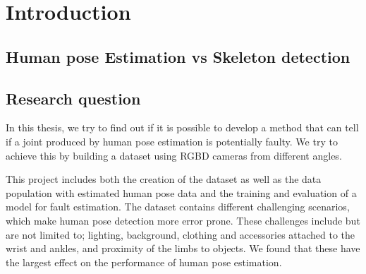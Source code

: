 \section{Introduction}

\subsection{Human pose Estimation vs Skeleton detection}



\subsection{Research question}

In this thesis, we try to find out if it is possible to develop a method that can tell if a joint produced by human pose estimation is potentially faulty. We try to achieve this by building a dataset using RGBD cameras from different angles.

This project includes both the creation of the dataset as well as the data population with estimated human pose data and the training and evaluation of a model for fault estimation. The dataset contains different challenging scenarios, which make human pose detection more error prone. These challenges include but are not limited to; lighting, background, clothing and accessories attached to the wrist and ankles, and proximity of the limbs to objects. We found that these have the largest effect on the performance of human pose estimation. 




